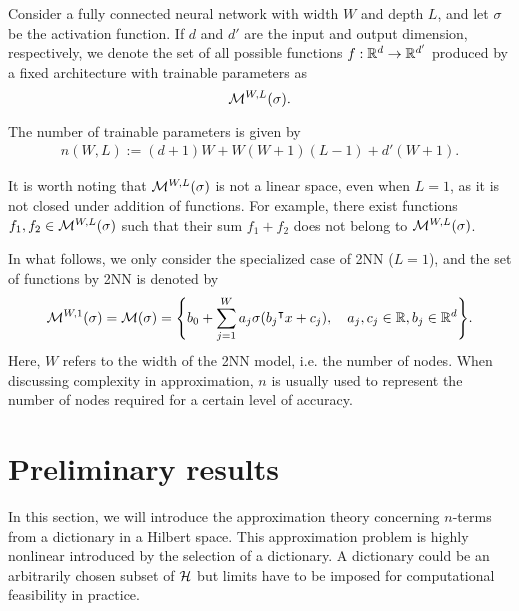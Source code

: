 Consider a fully connected neural network with width $W$ and depth $L$, and let
$\sigma$ be the activation function. If $d$ and $d'$ are the input and output
dimension, respectively, we denote the set of all possible functions $f: \mathbb{R}^d
\to \mathbb{R}^{d'}$ produced by a fixed architecture with trainable parameters as
\begin{equation}
    \mathcal{M}^{ {W}, {L} }( {\sigma} ).
\end{equation}

The number of trainable parameters is given by 
\begin{align}
    n(W, L) := (d + 1)W + W(W + 1)(L - 1) + d'(W + 1).
\end{align}

\begin{remark}
    It is worth noting that $\mathcal{M}^{ {W}, {L} }( {\sigma} )$ is not a linear space, even
    when $L = 1$, as it is not closed under addition of functions. For example,
    there exist functions $f_1, f_2 \in \mathcal{M}^{ {W}, {L} }( {\sigma} )$ such that their
    sum $f_1 + f_2$ does not belong to $\mathcal{M}^{ {W}, {L} }( {\sigma} )$.
\end{remark}

In what follows, we only consider the specialized case of 2NN ($L=1$), and the
set of functions by 2NN is denoted by
\begin{equation}
    \label{eq:set_of_all_functions_2nn}
    \mathcal{M}^{ {W}, {1} }( {\sigma} ) = \mathcal{M}(\sigma) =  \Bigg\{
        b_0 + \sum_{j=1}^W a_j \sigma(b_j{}^{\intercal} x + c_j), \quad
        a_j, c_j \in \mathbb{R},  b_j \in \mathbb{R}^d
    \Bigg\}.
\end{equation}
Here, $W$ refers to the width of the 2NN model, i.e. the number of nodes. When
discussing complexity in approximation, $n$ is usually used to represent the
number of nodes required for a certain level of accuracy.

\section{Preliminary results}
\label{sec:preliminary}





In this section, we will introduce the approximation theory concerning $n$-terms
from a dictionary in a Hilbert space. This approximation problem is highly
nonlinear introduced by the selection of a dictionary. A dictionary could be an
arbitrarily chosen subset of $\mathcal{H}$ but limits have to be imposed for
computational feasibility in practice. 

